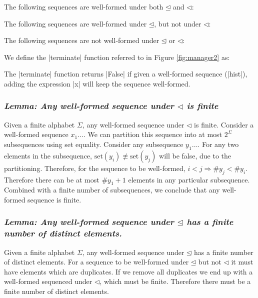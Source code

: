 \documentclass[draft]{sigplanconf}
\newcommand{\lemma}[1]{\subsubsection*{\textit{Lemma: #1}}}
\newcommand{\set}{\mathrm{set}}
\begin{document}
The following sequences are well-formed under both $\unlhd$ and $\lhd$:

\begin{code}
\end{code}

The following sequences are well-formed under $\unlhd$, but not under $\lhd$:

\begin{code}
\end{code}

The following sequences are not well-formed under $\unlhd$ or $\lhd$:

\begin{code}
\end{code}

We define the |terminate| function referred to in Figure \ref{fig:manager2} as:


The |terminate| function returns |False| if given a well-formed sequence (|hist|), adding the expression |x| will keep the sequence well-formed.

\lemma{Any well-formed sequence under $\lhd$ is finite}

Given a finite alphabet $\Sigma$, any well-formed sequence under $\lhd$ is finite. Consider a well-formed sequence $x_1\ldots$. We can partition this sequence into at most $2^\Sigma$ subsequences using set equality. Consider any subsequence $y_1\ldots$. For any two elements in the subsequence, $\set(y_i) \not\equiv \set(y_j)$ will be false, due to the partitioning. Therefore, for the sequence to be well-formed, $i < j \Rightarrow \# y_j < \# y_i$. Therefore there can be at most $\#y_1+1$ elements in any particular subsequence. Combined with a finite number of subsequences, we conclude that any well-formed sequence is finite.

\lemma{Any well-formed sequence under $\unlhd$ has a finite number of distinct elements.}

Given a finite alphabet $\Sigma$, any well-formed sequence under $\unlhd$ has a finite number of distinct elements. For a sequence to be well-formed under $\unlhd$ but not $\lhd$ it must have elements which are duplicates. If we remove all duplicates we end up with a well-formed sequenced under $\lhd$, which must be finite. Therefore there must be a finite number of distinct elements.
\end{document}
